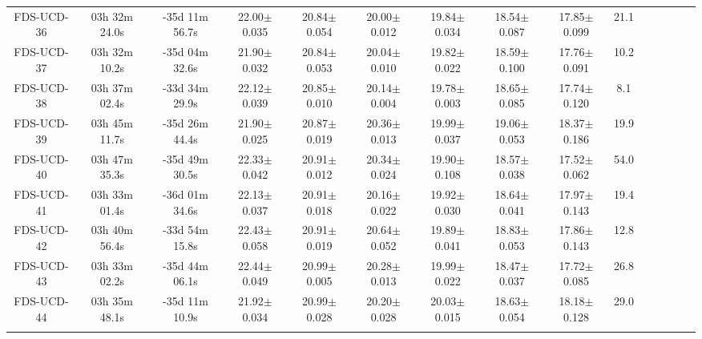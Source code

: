\documentclass[fleqn,usenatbib]{mnras}
\begin{document}
\begin{table*}
\begin{tabular}{ ccccccccccccccc }
FDS-UCD-36 & 03h 32m 24.0s & -35d 11m 56.7s & 22.00$\pm$0.035 & 20.84$\pm$0.054 & 20.00$\pm$0.012 & 19.84$\pm$0.034 & 18.54$\pm$0.087 & 17.85$\pm$0.099 & 21.1 \\ 
FDS-UCD-37 & 03h 32m 10.2s & -35d 04m 32.6s & 21.90$\pm$0.032 & 20.84$\pm$0.053 & 20.04$\pm$0.010 & 19.82$\pm$0.022 & 18.59$\pm$0.100 & 17.76$\pm$0.091 & 10.2 \\ 
FDS-UCD-38 & 03h 37m 02.4s & -33d 34m 29.9s & 22.12$\pm$0.039 & 20.85$\pm$0.010 & 20.14$\pm$0.004 & 19.78$\pm$0.003 & 18.65$\pm$0.085 & 17.74$\pm$0.120 & 8.1 \\ 
FDS-UCD-39 & 03h 45m 11.7s & -35d 26m 44.4s & 21.90$\pm$0.025 & 20.87$\pm$0.019 & 20.36$\pm$0.013 & 19.99$\pm$0.037 & 19.06$\pm$0.053 & 18.37$\pm$0.186 & 19.9 \\ 
FDS-UCD-40 & 03h 47m 35.3s & -35d 49m 30.5s & 22.33$\pm$0.042 & 20.91$\pm$0.012 & 20.34$\pm$0.024 & 19.90$\pm$0.108 & 18.57$\pm$0.038 & 17.52$\pm$0.062 & 54.0 \\ 
FDS-UCD-41 & 03h 33m 01.4s & -36d 01m 34.6s & 22.13$\pm$0.037 & 20.91$\pm$0.018 & 20.16$\pm$0.022 & 19.92$\pm$0.030 & 18.64$\pm$0.041 & 17.97$\pm$0.143 & 19.4 \\ 
FDS-UCD-42 & 03h 40m 56.4s & -33d 54m 15.8s & 22.43$\pm$0.058 & 20.91$\pm$0.019 & 20.64$\pm$0.052 & 19.89$\pm$0.041 & 18.83$\pm$0.053 & 17.86$\pm$0.143 & 12.8 \\ 
FDS-UCD-43 & 03h 33m 02.2s & -35d 44m 06.1s & 22.44$\pm$0.049 & 20.99$\pm$0.005 & 20.28$\pm$0.013 & 19.99$\pm$0.022 & 18.47$\pm$0.037 & 17.72$\pm$0.085 & 26.8 \\ 
FDS-UCD-44 & 03h 35m 48.1s & -35d 11m 10.9s & 21.92$\pm$0.034 & 20.99$\pm$0.028 & 20.20$\pm$0.028 & 20.03$\pm$0.015 & 18.63$\pm$0.054 & 18.18$\pm$0.128 & 29.0 \\ 

\hline 
\label{ucdtable}
\end{tabular}
\end{table*}


\label{lastpage}
\end{document}
